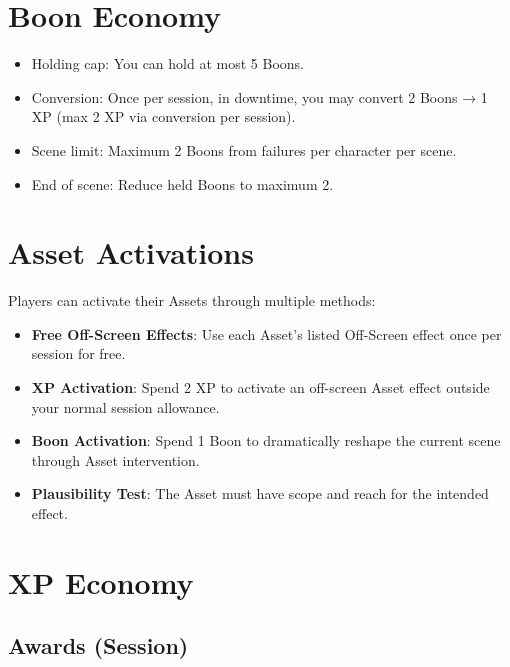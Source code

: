 \section{Boon Economy}

\begin{itemize}
    \item Holding cap: You can hold at most 5 Boons.
    \item Conversion: Once per session, in downtime, you may convert 2 Boons → 1 XP (max 2 XP via conversion per session).
    \item Scene limit: Maximum 2 Boons from failures per character per scene.
    \item End of scene: Reduce held Boons to maximum 2.
\end{itemize}

\section{Asset Activations}

Players can activate their Assets through multiple methods:

\begin{itemize}
    \item \textbf{Free Off-Screen Effects}: Use each Asset's listed Off-Screen effect once per session for free.
    \item \textbf{XP Activation}: Spend 2 XP to activate an off-screen Asset effect outside your normal session allowance.
    \item \textbf{Boon Activation}: Spend 1 Boon to dramatically reshape the current scene through Asset intervention.
    \item \textbf{Plausibility Test}: The Asset must have scope and reach for the intended effect.
\end{itemize}

\section{XP Economy}

\subsection{Awards (Session)}

